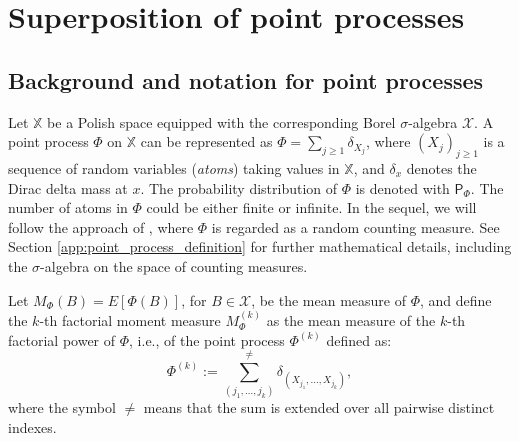 \documentclass[11pt,a4paper,oneside]{article}
\newcommand{\plaw}{\mathsf{P}}
\newcommand{\E}{E}
\newcommand{\Xcr}{\mathscr{X}}
\newcommand{\X}{\mathbb{X}}
\theoremstyle{definition}
\theoremstyle{remark}
\begin{document}

\section{Superposition of point processes}

\subsection{Background and notation for point processes} \label{sec:notation}


Let $\X$ be a Polish space equipped with the corresponding Borel $\sigma$-algebra $\Xcr$.  
A point process $\Phi$ on $\X$ can be represented as $\Phi = \sum_{j \geq 1} \delta_{X_j}$, where $(X_j)_{j\geq 1}$ is a sequence of random variables (\textit{atoms}) taking values in $\X$, and  $\delta_{x}$ denotes the Dirac delta mass at $x$. The probability distribution of $\Phi$ is denoted with $\plaw_{\Phi}$. The number of atoms in $\Phi$ could be either finite or infinite.
In the sequel, we will follow the approach of \cite{BaBlaKa}, where $\Phi$ is regarded as a random counting measure. See Section \ref{app:point_process_definition} for further mathematical details, including the $\sigma$-algebra on the space of counting measures. 

Let $M_{\Phi}(B) = \E[\Phi(B)]$, for $B \in \Xcr$, be the mean measure of $\Phi$, and define the $k$-th factorial moment measure 
$M_{\Phi}^{(k)}$ as the mean measure of the $k$-th factorial power of $\Phi$,  i.e., of the point process $\Phi^{(k)}$ defined as:
\[
    \Phi^{(k)} := \sum_{(j_1, \ldots, j_k)}^{\not =}  \delta_{(X_{j_1}, \ldots, X_{j_k})},
\]
where the symbol $\not =$ means that the sum is extended over all pairwise distinct indexes.
\end{document}
